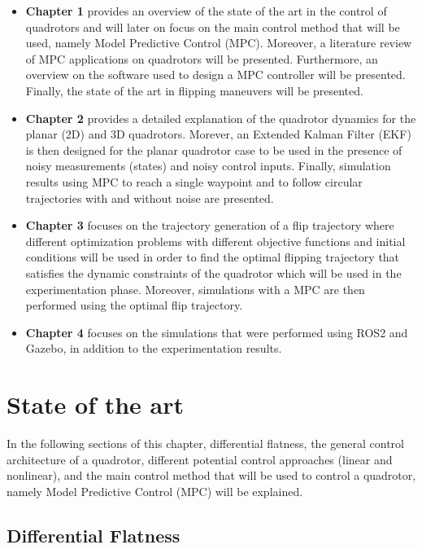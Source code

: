 \documentclass{thesisreport}
\begin{document}
\begin{itemize}
\setlength{\itemindent}{-.5in}
	\item [] \textbf{Chapter 1} provides an overview of the state of the art in the control of quadrotors and will later on focus on the main control method that will be used, namely Model Predictive Control (MPC). Moreover, a literature review of MPC applications on quadrotors will be presented. Furthermore, an overview on the software used to design a MPC controller will be presented. Finally, the state of the art in flipping maneuvers will be presented.
	
	 \item [] \textbf{Chapter 2} provides a detailed explanation of the quadrotor dynamics for the planar (2D) and 3D quadrotors. Morever, an Extended Kalman Filter (EKF) is then designed for the planar quadrotor case to be used in the presence of noisy measurements (states) and noisy control inputs. Finally, simulation results using MPC to reach a single waypoint and to follow circular trajectories with and without noise are presented.
	 
	 \item [] \textbf{Chapter 3} focuses on the trajectory generation of a flip trajectory where different optimization problems with different objective functions and initial conditions will be used in order to find the optimal flipping trajectory that satisfies the dynamic constraints of the quadrotor which will be used in the experimentation phase. Moreover, simulations with a MPC are then performed using the optimal flip trajectory.
	 
	 \item [] \textbf{Chapter 4} focuses on the simulations that were performed using ROS2 and Gazebo, in addition to the experimentation results.
\end{itemize}


\newpage
 
 \chapter{State of the art}
 
 In the following sections of this chapter, differential flatness,  the general control architecture of a quadrotor, different potential control approaches (linear and nonlinear), and the main control method that will be used to control a quadrotor, namely Model Predictive Control (MPC) will be explained. 
 \section{Differential Flatness}\label{Differential_flatness}  
 
\end{document}
